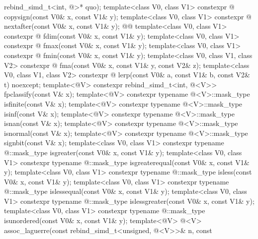 \begin{codeblock}
{                                           rebind_simd_t<int, @>* quo);
  template<class V0, class V1>
    constexpr @ copysign(const V0& x, const V1& y);
  template<class V0, class V1>
    constexpr @ nextafter(const V0& x, const V1& y);
    @\textrm{}@
  template<class V0, class V1>
    constexpr @ fdim(const V0& x, const V1& y);
  template<class V0, class V1>
    constexpr @ fmax(const V0& x, const V1& y);
  template<class V0, class V1>
    constexpr @ fmin(const V0& x, const V1& y);
  template<class V0, class V1, class V2>
    constexpr @ fma(const V0& x, const V1& y, const V2& z);
  template<class V0, class V1, class V2>
    constexpr @ lerp(const V0& a, const V1& b, const V2& t) noexcept;
  template<@\mathfloatingpoint@ V> constexpr rebind_simd_t<int, @\deducedsimd@<V>> fpclassify(const V& x);
  template<@\mathfloatingpoint@ V> constexpr typename @\deducedsimd@<V>::mask_type isfinite(const V& x);
  template<@\mathfloatingpoint@ V> constexpr typename @\deducedsimd@<V>::mask_type isinf(const V& x);
  template<@\mathfloatingpoint@ V> constexpr typename @\deducedsimd@<V>::mask_type isnan(const V& x);
  template<@\mathfloatingpoint@ V> constexpr typename @\deducedsimd@<V>::mask_type isnormal(const V& x);
  template<@\mathfloatingpoint@ V> constexpr typename @\deducedsimd@<V>::mask_type signbit(const V& x);
  template<class V0, class V1>
    constexpr typename @::mask_type isgreater(const V0& x, const V1& y);
  template<class V0, class V1>
    constexpr typename @::mask_type isgreaterequal(const V0& x, const V1& y);
  template<class V0, class V1>
    constexpr typename @::mask_type isless(const V0& x, const V1& y);
  template<class V0, class V1>
    constexpr typename @::mask_type islessequal(const V0& x, const V1& y);
  template<class V0, class V1>
    constexpr typename @::mask_type islessgreater(const V0& x, const V1& y);
  template<class V0, class V1>
    constexpr typename @::mask_type isunordered(const V0& x, const V1& y);
  template<@\mathfloatingpoint@ V>
    @\deducedsimd@<V> assoc_laguerre(const rebind_simd_t<unsigned, @\deducedsimd@<V>>& n, const
}
\end{codeblock}
